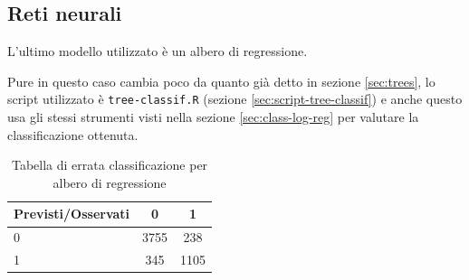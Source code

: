 \subsection{Reti neurali}\label{sec:class-nnet}

L'ultimo modello utilizzato è un albero di regressione.

Pure in questo caso cambia poco da quanto già detto in sezione
\ref{sec:trees}, lo script utilizzato è \texttt{tree-classif.R} (sezione
\ref{sec:script-tree-classif}) e anche questo usa gli stessi strumenti visti
nella sezione \ref{sec:class-log-reg} per valutare la classificazione ottenuta.

\begin{table}[H]
\begin{center}
\begin{tabular}{ | l || c | c | }
  \hline
    Previsti/Osservati & 0 & 1 \\ \hline \hline
    0 & 3755 & 238 \\ \hline
    1 & 345 & 1105 \\ \hline
\end{tabular}
  \caption{Tabella di errata classificazione per albero di regressione}
\end{center}
\end{table}

